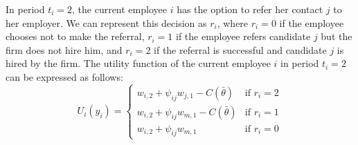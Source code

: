 \documentclass[12pt]{article}
\begin{document}
In period $t_i = 2$, the current employee $i$ has the option to refer her contact $j$ to her employer. We can represent this decision as $r_i$, where $r_i = 0$ if the employee chooses not to make the referral, $r_i = 1$ if the employee refers candidate $j$ but the firm does not hire him, and $r_i = 2$ if the referral is successful and candidate $j$ is hired by the firm. The utility function of the current employee $i$ in period $t_i = 2$ can be expressed as follows:
\begin{equation}\label{eq:utilitiy}
        U_{i}(y_i) = 
        \begin{cases}
		w_{i,2} + \psi_{ij} w_{j,1} - C(\bar{\theta}) & \text{if } r_i = 2 \\
		w_{i,2} + \psi_{ij} w_{m,1} - C(\bar{\theta}) & \text{if } r_i = 1 \\
        w_{i,2} + \psi_{ij} w_{m,1} & \text{if } r_i = 0
        \end{cases}
\end{equation}

\end{document}
